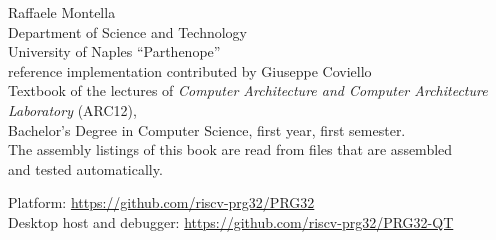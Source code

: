 \begin{titlepage}
\vfill

\begin{flushleft}
{\sffamily\Large\color{prgink} Raffaele Montella}\\[4pt]
{\sffamily\normalsize\color{prgink}
Department of Science and Technology\\
University of Naples ``Parthenope''}\\[14pt]
{\sffamily\normalsize\color{prgsteel}
\vermone reference implementation contributed by Giuseppe Coviello}\\[14pt]
{\small Textbook of the lectures of \emph{Computer Architecture and Computer
Architecture Laboratory} (ARC12),\\ Bachelor's Degree in Computer Science,
first year, first semester.\\[6pt]
The assembly listings of this book are read from files that are assembled\\ and tested automatically.}
\end{flushleft}

\vspace{1.2cm}
{\footnotesize\color{prgcomment} Platform: \url{https://github.com/riscv-prg32/PRG32}\\
Desktop host and debugger: \url{https://github.com/riscv-prg32/PRG32-QT}}
\end{titlepage}
